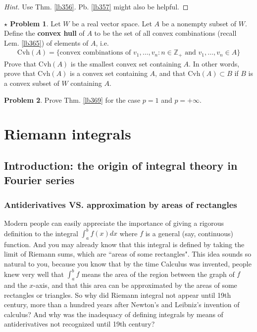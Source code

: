 \documentclass[12pt,b5paper,notitlepage]{article}
\theoremstyle{definition}
\newtheorem{prob}{\color{red}Problem}[section]
\newtheorem{sprob}[prob]{\color{red}$\star$ Problem}
\theoremstyle{plain}
\newcommand{\Zbb}{\mathbb Z}
\numberwithin{equation}{section}
\begin{document}
\begin{proof}[Hint]
Use Thm. \ref{lb356}.  Pb.  \ref{lb357} might also be helpful.
\end{proof}




\begin{sprob}
Let $W$ be a real vector space. Let $A$ be a nonempty subset of $W$. Define the \textbf{convex hull}  of $A$ to be the set of all convex combinations (recall Lem. \ref{lb365}) of elements of $A$, i.e.
\begin{align}
\mathrm{Cvh}(A)=\big\{\text{convex combinations of }v_1,\dots,v_n:n\in\Zbb_+\text{ and } v_1,\dots,v_n\in A\big\}
\end{align}
Prove that $\mathrm{Cvh}(A)$ is the smallest convex set containing $A$. In other words, prove that $\mathrm{Cvh}(A)$ is a convex set containing $A$, and that $\mathrm{Cvh}(A)\subset B$ if $B$ is a convex subset of $W$ containing $A$.
\end{sprob}



\begin{prob}
Prove Thm. \ref{lb369} for the case $p=1$ and $p=+\infty$.
\end{prob}












\newpage



\section{Riemann integrals}



\subsection{Introduction: the origin of integral theory in Fourier series}\label{lb550}



\subsubsection{Antiderivatives VS. approximation by areas of rectangles}

Modern people can easily appreciate the importance of giving a rigorous definition to the integral $\int_a^bf(x)dx$ where $f$ is a general (say, continuous) function. And you may already know that this integral is defined by taking the limit of Riemann sums, which are ``areas of some rectangles". This idea sounds so natural to you, because you know that by the time Calculus was invented, people knew very well that  $\int_a^b f$ means the area of the region between the graph of $f$ and the $x$-axis, and that this area can be approximated by the areas of some rectangles or triangles. So why did Riemann integral not appear until 19th century, more than a hundred years after Newton's and Leibniz's invention of calculus? And why was the inadequacy of defining integrals by means of antiderivatives not recognized until 19th century?
\end{document}
